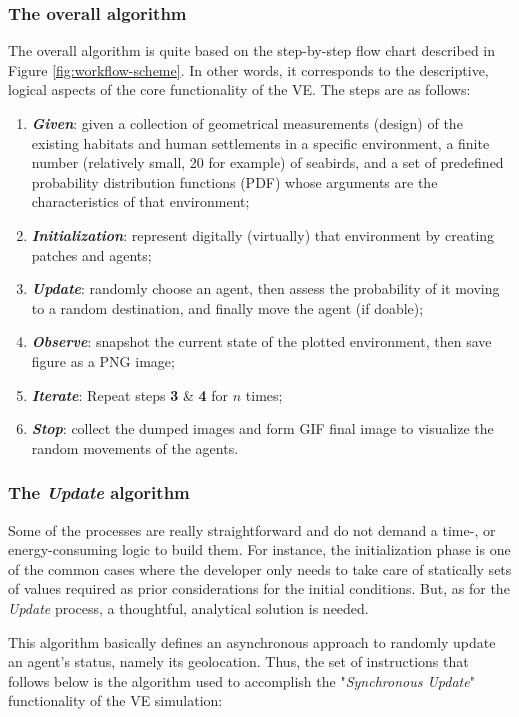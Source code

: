 \subsubsection{The overall algorithm}
The overall algorithm is quite based on the step-by-step flow chart described in Figure \ref{fig:workflow-scheme}. In other words, it corresponds to the descriptive, logical aspects of the core functionality of the VE. The steps are as follows:

\begin{enumerate}
    \item \textbf{\textit{Given}}: given a collection of geometrical measurements (design) of the existing habitats and human settlements in a specific environment, a finite number (relatively small, 20 for example) of seabirds, and a set of predefined probability distribution functions (PDF) whose arguments are the characteristics of that environment;
    \item \textbf{\textit{Initialization}}: represent digitally (virtually) that environment by creating patches and agents;
    \item \textbf{\textit{Update}}: randomly choose an agent, then assess the probability of it moving to a random destination, and finally move the agent (if doable);
    \item \textbf{\textit{Observe}}: snapshot the current state of the plotted environment, then save figure as a PNG image;
    \item \textbf{\textit{Iterate}}: Repeat steps \textbf{3} \& \textbf{4} for $n$ times;
    \item \textbf{\textit{Stop}}: collect the dumped images and form GIF final image to visualize the random movements of the agents.
\end{enumerate}


\subsubsection{The \emph{Update} algorithm}
Some of the processes are really straightforward and do not demand a time-, or energy-consuming logic to build them. For instance, the initialization phase is one of the common cases where the developer only needs to take care of statically sets of values required as prior considerations for the initial conditions. But, as for the \emph{Update} process, a thoughtful, analytical solution is needed.

This algorithm basically defines an asynchronous approach to randomly update an agent's status, namely its geolocation. Thus, the set of instructions that follows below is the algorithm used to accomplish the "\emph{Synchronous Update}" functionality of the VE simulation:


